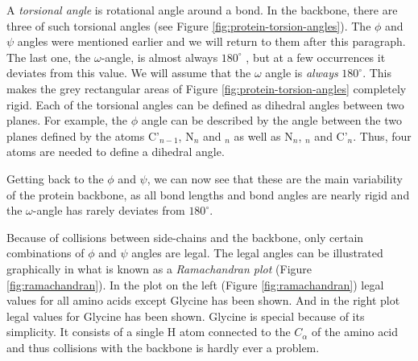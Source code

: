 A \textit{torsional angle} is rotational angle around a bond. In the
backbone, there are three of such torsional angles (see Figure
\ref{fig:protein-torsion-angles}). The $\phi$ and $\psi$ angles were
mentioned earlier and we will return to them after this paragraph. The
last one, the $\omega$-angle, is almost always $180^{\circ}$
\cite{probik}, but at a few occurrences it deviates from this
value. We will assume that the $\omega$ angle is \textit{always}
$180^{\circ}$. This makes the grey rectangular areas of Figure
\ref{fig:protein-torsion-angles} completely rigid.  Each of the
torsional angles can be defined as dihedral angles between two
planes. For example, the $\phi$ angle can be described by the angle
between the two planes defined by the atoms C'$_{n-1}$, N$_n$ and \Ca
$_n$ as well as N$_n$, \Ca $_n$ and C'$_n$. Thus, four atoms are
needed to define a dihedral angle.

Getting back to the $\phi$ and $\psi$, we can now see that these are
the main variability of the protein backbone, as all bond lengths and
bond angles are nearly rigid and the $\omega$-angle has rarely
deviates from $180^\circ$. 

Because of collisions between side-chains and the backbone, only
certain combinations of $\phi$ and $\psi$ angles are legal. The legal
angles can be illustrated graphically in what is known as a
\textit{Ramachandran plot} (Figure \ref{fig:ramachandran}). In the
plot on the left (Figure \ref{fig:ramachandran}) legal values for all
amino acids except Glycine has been shown. And in the right plot legal
values for Glycine has been shown. Glycine is special because of its
simplicity. It consists of a single H atom connected to the $C_\alpha$
of the amino acid and thus collisions with the backbone is hardly ever
a problem.

